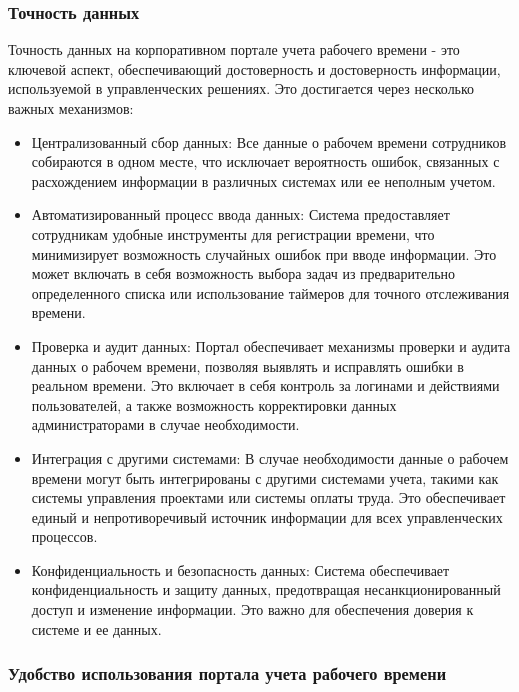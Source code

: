 \subsubsection{Точность данных}

Точность данных на корпоративном портале учета рабочего времени - это ключевой аспект, обеспечивающий достоверность и достоверность информации, используемой в управленческих решениях. Это достигается через несколько важных механизмов:

\begin{itemize}	
\item Централизованный сбор данных: Все данные о рабочем времени сотрудников собираются в одном месте, что исключает вероятность ошибок, связанных с расхождением информации в различных системах или ее неполным учетом.

\item Автоматизированный процесс ввода данных: Система предоставляет сотрудникам удобные инструменты для регистрации времени, что минимизирует возможность случайных ошибок при вводе информации. Это может включать в себя возможность выбора задач из предварительно определенного списка или использование таймеров для точного отслеживания времени.

\item Проверка и аудит данных: Портал обеспечивает механизмы проверки и аудита данных о рабочем времени, позволяя выявлять и исправлять ошибки в реальном времени. Это включает в себя контроль за логинами и действиями пользователей, а также возможность корректировки данных администраторами в случае необходимости.

\item Интеграция с другими системами: В случае необходимости данные о рабочем времени могут быть интегрированы с другими системами учета, такими как системы управления проектами или системы оплаты труда. Это обеспечивает единый и непротиворечивый источник информации для всех управленческих процессов.

\item Конфиденциальность и безопасность данных: Система обеспечивает конфиденциальность и защиту данных, предотвращая несанкционированный доступ и изменение информации. Это важно для обеспечения доверия к системе и ее данных.
\end{itemize}

\subsubsection{Удобство использования портала учета рабочего времени}


